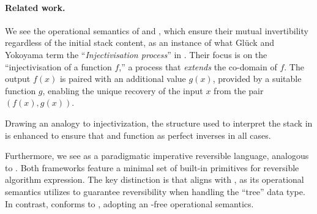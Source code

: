 \paragraph{Related work.}
We see the operational semantics of  and , which ensure their mutual invertibility regardless of the initial stack content, as an instance of what Glück and Yokoyama term the ``\emph{Injectivisation process}'' in \cite{GLUCK2023113429}. 
Their focus is on the ``injectivisation of a function $f$,'' a process that \emph{extends} the co-domain of $f$. The output $f(x)$ is paired with an additional value $g(x)$, provided by a suitable function $g$, enabling the unique recovery of the input $x$ from the pair $(f(x), g(x))$. 

Drawing an analogy to injectivization, the structure used to interpret the stack in \SCORE is enhanced to ensure that  and  function as perfect inverses in all cases.

Furthermore, we see \SCORE as a paradigmatic imperative reversible language, analogous to \RCORE \cite{Glck2017AMR}. Both frameworks feature a minimal set of built-in primitives for reversible algorithm expression. The key distinction is that \RCORE aligns with \PIF, as its operational semantics utilizes  to guarantee reversibility when handling the ``tree'' data type. In contrast, \SCORE conforms to \TIF, adopting an -free operational semantics.
